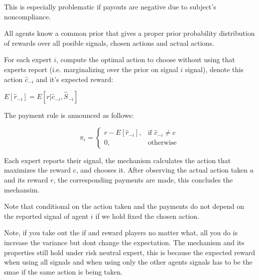 This is especially problematic if payouts are negative due to subject's noncompliance.

All agents know a common prior that gives a proper prior probability distribution of rewards over all posible signals, chosen actions and actual actions.

\begin{mech}



For each expert $i$, compute the optimal action to choose without using that experts report (i.e. marginalizing over the prior on signal $i$ signal), denote this action $\hat{c}_{-i}$ and it's expected reward:

$E[\hat{r}_{-i}] = E[ r| \hat{c}_{-i}, \hat{S}_{-i}] $


 The payment rule is announced as follows:

\[
    \pi_i = 
\begin{cases}
    r - E[\hat{r}_{-i}] ,& \text{if } \hat{c}_{-i} \neq c\\
    0,              & \text{otherwise}
\end{cases}
\]

%

Each expert reports their signal, the mechanism calculates the action that maximizes the reward $c$, and chooses it. After observing the actual action taken $a$ and its reward $r$, the corresponding payments are made, this concludes the mechansim.

Note that conditional on the action taken and the payments do not depend on the reported signal of agent $i$ if we hold fixed the chosen action. 

\end{mech}

Note, if you take out the if and reward players no matter what, all you do is increase the variance but dont change the expectation. The  mechanism and its properties still hold under risk neutral expert,  this is because the expected reward when using all signals and when using only the other agents signals has to be the smae if the same action is being taken. 


